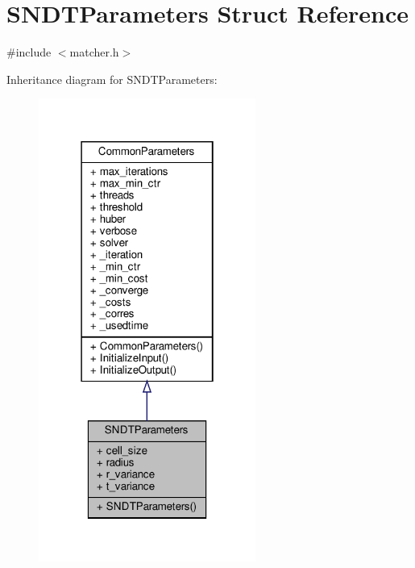 \hypertarget{structSNDTParameters}{}\section{S\+N\+D\+T\+Parameters Struct Reference}
\label{structSNDTParameters}


{\ttfamily \#include $<$matcher.\+h$>$}



Inheritance diagram for S\+N\+D\+T\+Parameters\+:\nopagebreak
\begin{figure}[H]
\begin{center}
\leavevmode
\includegraphics[width=202pt]{d0/d99/structSNDTParameters__inherit__graph}
\end{center}
\end{figure}



